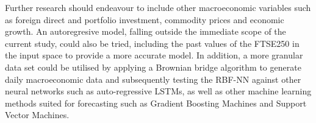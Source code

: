 \documentclass[11pt,a4paper]{article}
\begin{document}
Further research should endeavour to include other macroeconomic variables such as 
foreign direct and portfolio investment, commodity prices and economic growth.
An autoregresive model, falling outside the immediate scope of the current study, could also be tried, including the past values of the 
FTSE250 in the input space to provide a more accurate model. In addition, 
a more granular data set could be utilised by applying a 
Brownian bridge algorithm to generate daily macroeconomic data and 
subsequently testing the RBF-NN against other neural networks 
such as auto-regressive LSTMs, as well as other machine learning methods suited for 
forecasting such as Gradient Boosting Machines and Support Vector Machines. 



\end{document}
